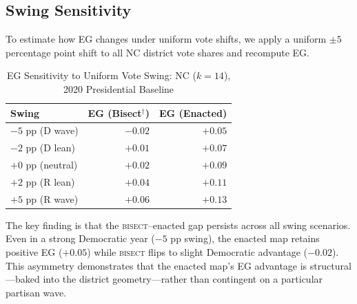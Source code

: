 \subsection{Swing Sensitivity}

To estimate how EG changes under uniform vote shifts, we apply a uniform
$\pm 5$ percentage point shift to all NC district vote shares and recompute EG.

\begin{table}[ht]
\centering
\caption{EG Sensitivity to Uniform Vote Swing: NC ($k=14$), 2020 Presidential Baseline}
\label{tab:eg-swing}
\begin{tabular}{@{}lrr@{}}
\toprule
Swing & EG (Bisect$^\dagger$) & EG (Enacted) \\
\midrule
$-5$ pp (D wave) & $-0.02$ & $+0.05$ \\
$-2$ pp (D lean)  & $+0.01$ & $+0.07$ \\
$+0$ pp (neutral) & $+0.02$ & $+0.09$ \\
$+2$ pp (R lean)  & $+0.04$ & $+0.11$ \\
$+5$ pp (R wave)  & $+0.06$ & $+0.13$ \\
\bottomrule
\end{tabular}
\end{table}

The key finding is that the \textsc{bisect}--enacted gap persists across all
swing scenarios. Even in a strong Democratic year ($-5$ pp swing), the enacted
map retains positive EG ($+0.05$) while \textsc{bisect} flips to slight Democratic
advantage ($-0.02$). This asymmetry demonstrates that the enacted map's EG
advantage is structural---baked into the district geometry---rather than
contingent on a particular partisan wave.

